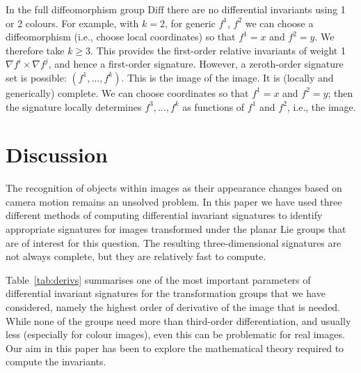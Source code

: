 \documentclass[review,onefignum,onetabnum]{siamonline190516}
\begin{document}
In the full diffeomorphism group $\mathrm{Diff}$ there are no differential invariants using 1 or 2 colours. For example, with $k=2$, for generic $f^1$, $f^2$ we can choose a diffeomorphism (i.e., choose local coordinates) so that $f^1=x$ and $f^2=y$. We therefore take $k\ge 3$. This provides the first-order relative invariants of weight 1 $\nabla f^i\times \nabla f^j$, and hence a first-order signature. However, a zeroth-order signature set is possible: $(f^1,\dots,f^k)$. This is the image of the image. It is (locally and generically) complete. We can choose coordinates so that $f^1=x$ and $f^2=y$; then the signature locally determines $f^3,\dots,f^k$ as functions of $f^1$ and $f^2$, i.e., the image.

\section{Discussion}


The recognition of objects within images as their appearance changes based on camera motion remains an unsolved problem. In this paper we have used three different methods of computing differential invariant signatures to identify appropriate signatures for images transformed under the planar Lie groups that are of interest for this question. The resulting three-dimensional signatures are not always complete, but they are relatively fast to compute.

Table~\ref{tab:derivs} summarises one of the most important parameters of differential invariant signatures for the transformation groups that we have considered, namely the highest order of derivative of the image that is needed. While none of the groups need more than third-order differentiation, and usually less (especially for colour images), even this can be problematic for real images. Our aim in this paper has been to explore the mathematical theory required to compute the invariants. 
\end{document}

